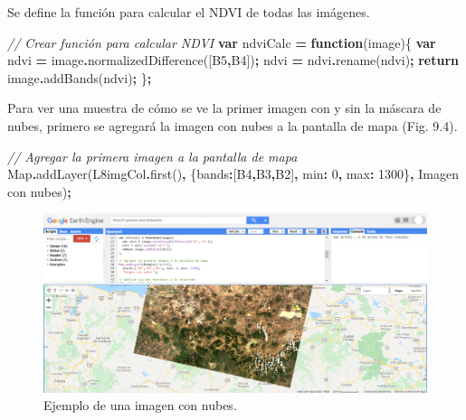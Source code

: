 \documentclass[
  12pt,
  letterpaper,
  twoside]{book}
\newenvironment{Shaded}{\begin{snugshade}}{\end{snugshade}}
\newcommand{\BuiltInTok}[1]{#1}
\newcommand{\CommentTok}[1]{\textcolor[rgb]{0.56,0.35,0.01}{\textit{#1}}}
\newcommand{\ControlFlowTok}[1]{\textcolor[rgb]{0.13,0.29,0.53}{\textbf{#1}}}
\newcommand{\DataTypeTok}[1]{\textcolor[rgb]{0.13,0.29,0.53}{#1}}
\newcommand{\DecValTok}[1]{\textcolor[rgb]{0.00,0.00,0.81}{#1}}
\newcommand{\FunctionTok}[1]{\textcolor[rgb]{0.00,0.00,0.00}{#1}}
\newcommand{\KeywordTok}[1]{\textcolor[rgb]{0.13,0.29,0.53}{\textbf{#1}}}
\newcommand{\NormalTok}[1]{#1}
\newcommand{\OperatorTok}[1]{\textcolor[rgb]{0.81,0.36,0.00}{\textbf{#1}}}
\newcommand{\StringTok}[1]{\textcolor[rgb]{0.31,0.60,0.02}{#1}}
\begin{document}
Se define la función para calcular el NDVI de todas las imágenes.

\begin{Shaded}
\begin{Highlighting}[]
\CommentTok{// Crear función para calcular NDVI}
\KeywordTok{var}\NormalTok{ ndviCalc }\OperatorTok{=} \KeywordTok{function}\NormalTok{(image)\{}
  \KeywordTok{var}\NormalTok{ ndvi }\OperatorTok{=}\NormalTok{ image}\OperatorTok{.}\FunctionTok{normalizedDifference}\NormalTok{([}\StringTok{\textquotesingle{}B5\textquotesingle{}}\OperatorTok{,}\StringTok{\textquotesingle{}B4\textquotesingle{}}\NormalTok{])}\OperatorTok{;}
\NormalTok{  ndvi }\OperatorTok{=}\NormalTok{ ndvi}\OperatorTok{.}\FunctionTok{rename}\NormalTok{(}\StringTok{\textquotesingle{}ndvi\textquotesingle{}}\NormalTok{)}\OperatorTok{;}
    \ControlFlowTok{return}\NormalTok{ image}\OperatorTok{.}\FunctionTok{addBands}\NormalTok{(ndvi)}\OperatorTok{;}
\NormalTok{\}}\OperatorTok{;}
\end{Highlighting}
\end{Shaded}

Para ver una muestra de cómo se ve la primer imagen con y sin la máscara de nubes, primero se agregará la imagen con nubes a la pantalla de mapa (Fig. 9.4).

\begin{Shaded}
\begin{Highlighting}[]
\CommentTok{// Agregar la primera imagen a la pantalla de mapa}
\BuiltInTok{Map}\OperatorTok{.}\FunctionTok{addLayer}\NormalTok{(L8imgCol}\OperatorTok{.}\FunctionTok{first}\NormalTok{()}\OperatorTok{,} 
\NormalTok{  \{}\DataTypeTok{bands}\OperatorTok{:}\NormalTok{[}\StringTok{\textquotesingle{}B4\textquotesingle{}}\OperatorTok{,}\StringTok{\textquotesingle{}B3\textquotesingle{}}\OperatorTok{,}\StringTok{\textquotesingle{}B2\textquotesingle{}}\NormalTok{]}\OperatorTok{,} \DataTypeTok{min}\OperatorTok{:} \DecValTok{0}\OperatorTok{,} \DataTypeTok{max}\OperatorTok{:} \DecValTok{1300}\NormalTok{\}}\OperatorTok{,}
  \StringTok{\textquotesingle{}Imagen con nubes\textquotesingle{}}\NormalTok{)}\OperatorTok{;}
\end{Highlighting}
\end{Shaded}

\begin{figure}[btp]

{\centering \includegraphics[width=1\linewidth]{Img/imNubes} 

}

\caption{Ejemplo de una imagen con nubes.}\label{fig:unnamed-chunk-157}
\end{figure}
\end{document}
